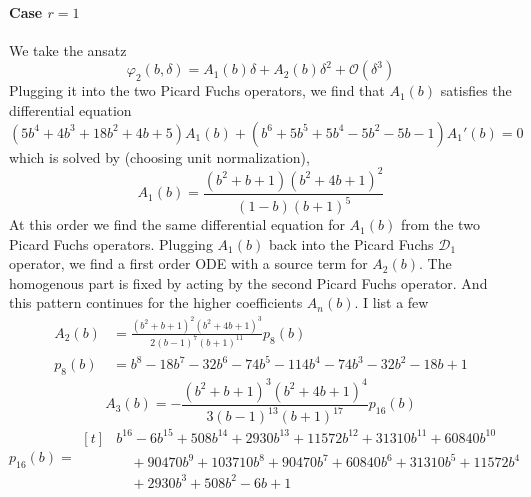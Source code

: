 \documentclass[11pt, a4paper]{article}
\numberwithin{equation}{section}
\begin{document}
\paragraph{Case $r = 1$}
We take the ansatz
\begin{equation}
  \varphi_2(b, \delta) = A_1(b) \delta + A_2(b) \delta^2 + \mathcal{O}(\delta^3)
\end{equation}
Plugging it into the two Picard Fuchs operators, we find that $A_1(b)$ satisfies the differential equation
\begin{equation}
  \left(5 b^4+4 b^3+18 b^2+4 b+5\right) A_1(b)+\left(b^6+5 b^5+5 b^4-5 b^2-5 b-1\right) A_1'(b) = 0
\end{equation}
which is solved by (choosing unit normalization),
\begin{equation}
  A_1(b) = \frac{\left(b^2+b+1\right) \left(b^2+4 b+1\right)^2}{(1-b) (b+1)^5}
\end{equation}
At this order we find the same differential equation for $A_1(b)$ from the two Picard Fuchs operators. Plugging $A_1(b)$ back into the Picard Fuchs $\mathcal{D}_1$ operator, we find a first order ODE with a source term for $A_2(b)$. The homogenous part is fixed by acting by the second Picard Fuchs operator. And this pattern continues for the higher coefficients $A_n(b)$. I list a few
\begin{equation}
  \begin{aligned}
    A_2(b) &= \frac{\left(b^2+b+1\right)^2 \left(b^2+4 b+1\right)^3}{2 (b-1)^7 (b+1)^{11}} p_8(b) \\
    p_8(b) &= b^8-18 b^7-32 b^6-74 b^5-114 b^4-74 b^3-32 b^2-18 b+1
  \end{aligned}
\end{equation}
\begin{equation}
  A_3(b) = -\frac{\left(b^2+b+1\right)^3 \left(b^2+4 b+1\right)^4}{3 (b-1)^{13} (b+1)^{17}} p_{16}(b)
\end{equation}
\begin{equation}
  p_{16}(b) = \begin{aligned}[t]
      & b^{16}-6 b^{15}+508 b^{14}+2930 b^{13}+11572 b^{12}+31310 b^{11}+60840 b^{10}\\
      &\quad +90470 b^9+103710 b^8+90470 b^7+60840 b^6+31310 b^5+11572 b^4\\
      &\quad +2930 b^3+508 b^2-6 b+1
    \end{aligned}
\end{equation}
\end{document}
